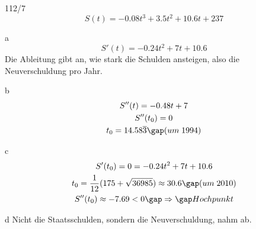 \newpage
\begin{exercise}{112/7}
  $$S(t) = -0.08t^3 + 3.5t^2 + 10.6t + 237$$
  \item [a]
  $$S'(t) = -0.24t^2 + 7t + 10.6$$
  Die Ableitung gibt an, wie stark die Schulden ansteigen, also die Neuverschuldung pro Jahr.
  \item [b]
  \begin{gather*}
    S''(t) = -0.48t + 7 \\
    S''(t_0) = 0 \\
    t_0 = 14.58\overline{3} \gap (um \; 1994)
  \end{gather*}
  \item [c]
  \begin{gather*}
    S'(t_0) = 0 = -0.24t^2 + 7t + 10.6 \\
    t_0 = \frac{1}{12}(175 + \sqrt{36985}) \approx 30.6 \gap (um \; 2010) \\
    S''(t_0) \approx -7.69 < 0 \gap\Rightarrow\gap Hochpunkt
  \end{gather*}
  \item [d]
  Nicht die Staatsschulden, sondern die Neuverschuldung, nahm ab.
\end{exercise}
